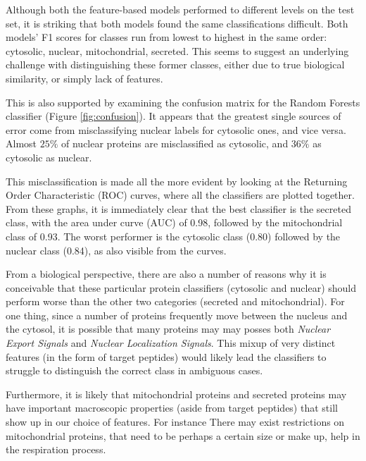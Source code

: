 \documentclass{bioinfo}
\begin{document}
Although both the feature-based models performed to different levels on the test set, it is striking that both models found the same classifications difficult. 
Both models' F1 scores for classes run from lowest to highest in the same order: cytosolic, nuclear, mitochondrial, secreted.
This seems to suggest an underlying challenge with distinguishing these former classes, either due to true biological similarity, or simply lack of features.

This is also supported by examining the confusion matrix for the Random Forests classifier (Figure \ref{fig:confusion}).
It appears that the greatest single sources of error come from misclassifying nuclear labels for cytosolic ones, and vice versa. Almost $25\%$ of nuclear proteins are misclassified as cytosolic, and $36\%$ as cytosolic as nuclear.

This misclassification is made all the more evident by looking at the Returning Order Characteristic (ROC) curves, where all the classifiers are plotted together. 
From these graphs, it is immediately clear that the best classifier is the secreted class, with the area under curve (AUC) of 0.98, followed by the mitochondrial class of 0.93. The worst performer is the cytosolic class (0.80) followed by the nuclear class (0.84), as also visible from the curves.

From a biological perspective, there are also a number of reasons why it is conceivable that these particular protein classifiers (cytosolic and nuclear) should perform worse than the other two categories (secreted and mitochondrial). 
For one thing, since a number of proteins frequently move between the nucleus and the cytosol, it is possible that many proteins may may posses both \textit{Nuclear Export Signals} and \textit{Nuclear Localization Signals}. 
This mixup of very distinct features (in the form of target peptides) would likely lead the classifiers to struggle to distinguish the correct class in ambiguous cases.

Furthermore, it is likely that mitochondrial proteins and secreted proteins may have important macroscopic properties (aside from target peptides) that still show up in our choice of features.
For instance There may exist restrictions on mitochondrial proteins, that need to be perhaps a certain size or make up, help in the respiration process.

\end{document}
